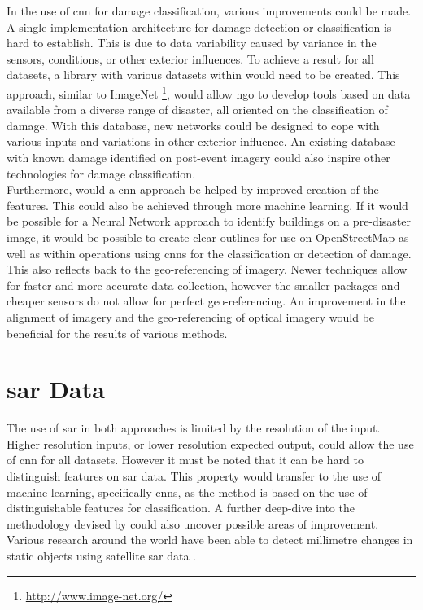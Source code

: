 \noindent In the use of \ac{cnn} for damage classification, various improvements could be made. A single implementation architecture for damage detection or classification is hard to establish. This is due to  data variability caused by variance in the sensors, conditions, or other exterior influences. To achieve a result for all datasets, a library with various datasets within would need to be created. This approach, similar to ImageNet \footnote{\url{http://www.image-net.org/}}, would allow \ac{ngo} to develop tools based on data available from a diverse range of disaster, all oriented on the classification of damage. With this database, new networks could be designed to cope with various inputs and variations in other exterior influence. An existing database with known damage identified on post-event imagery could also inspire other technologies for damage classification.\\

\noindent Furthermore, would a \ac{cnn} approach be helped by improved creation of the features. This could also be achieved through more machine learning. If it would be possible for a Neural Network approach to identify buildings on a pre-disaster image, it would be possible to create clear outlines for use on OpenStreetMap as well as within operations using \ac{cnn}s for the classification or detection of damage. This also reflects back to the geo-referencing of imagery. Newer techniques allow for faster and more accurate data collection, however the smaller packages and cheaper sensors do not allow for perfect geo-referencing. An improvement in the alignment of imagery and the geo-referencing of optical imagery would be beneficial for the results of various methods.

\section{\ac{sar} Data}
The use of \ac{sar} in both approaches is limited by the resolution of the input. Higher resolution inputs, or lower resolution expected output, could allow the use of \ac{cnn} for all datasets. However it must be noted that it can be hard to distinguish features on \ac{sar} data. This property would transfer to the use of machine learning, specifically \ac{cnn}s, as the method is based on the use of distinguishable features for classification.  A further deep-dive into the methodology devised by \citet{Yun2015} could also uncover possible areas of improvement. Various research around the world have been able to detect millimetre changes in static objects using satellite \ac{sar} data \citep{SOUSA2010181}.\\ 

